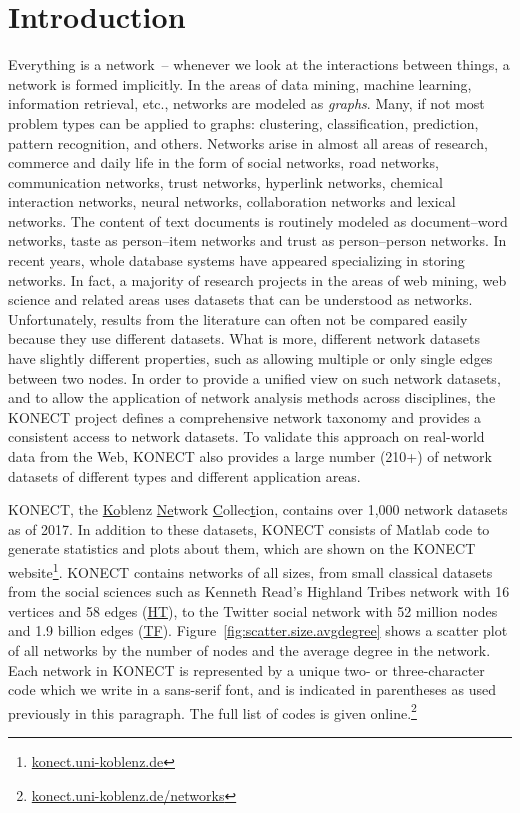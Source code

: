 \documentclass{article}
\begin{document}
\thispagestyle{empty}
\newpage

\section{Introduction}
Everything is a network~-- whenever we look at the interactions between
things, a network is formed implicitly.  In the areas of data mining,
machine learning, information retrieval, etc., networks are modeled
as \emph{graphs}.  Many, if not most problem types can be applied to
graphs: clustering, classification, prediction, pattern recognition, and
others.  Networks arise in almost all areas of research, commerce and
daily life in the form of social networks, road networks, communication
networks, trust networks, hyperlink networks, chemical interaction
networks, neural networks, collaboration networks and lexical networks.
The content of text documents is routinely modeled as document--word
networks, taste as person--item networks and trust as person--person
networks.  In recent years, whole database systems have appeared
specializing in storing networks.  In fact, a majority of research
projects in the areas of web mining, web science and related areas uses
datasets that can be understood as networks.  Unfortunately, results
from the literature can often not be compared easily because
they use different datasets. What is more, different network datasets
have slightly different properties, such as allowing multiple or only
single edges between two nodes.  In order to provide a unified view on
such network datasets, and to allow the application of network analysis
methods across disciplines, the KONECT project defines a comprehensive
network taxonomy and provides a consistent access to network datasets.
To validate this approach on real-world data from the Web, KONECT
also provides a large number (210+) of network datasets of different
types and different application areas. 

KONECT, the \underline{Ko}blenz \underline{Ne}twork \underline
Collec\underline tion, contains over 1,000 network datasets as of 2017.
In addition to these datasets, KONECT consists of Matlab code to
generate statistics and plots about them, which are shown on the
KONECT
website\footnote{\href{http://konect.uni-koblenz.de/}{konect.uni-koblenz.de}}.
KONECT contains networks of all sizes, from small classical datasets
from the social sciences such as Kenneth Read's Highland Tribes network
with 16 vertices and 58 edges
(\href{http://konect.uni-koblenz.de/networks/ucidata-gama}{\textsf{HT}}),
to the Twitter social network with 52 million nodes and 1.9 billion
edges
(\href{http://konect.uni-koblenz.de/networks/twitter_mpi}{\textsf{TF}}).
Figure~\ref{fig:scatter.size.avgdegree} shows a scatter plot of all
networks by the number of nodes and the average degree in the network.
Each network in KONECT is represented by a unique two- or
three-character code which we write in a \textsf{sans-serif font}, and
is indicated in parentheses as used previously in this paragraph. The
full list of codes is given
online.\footnote{\href{http://konect.uni-koblenz.de/networks}{konect.uni-koblenz.de/networks}}
\end{document}

